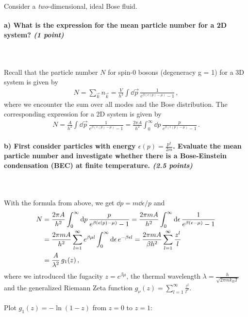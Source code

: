 Consider a \textit{two}-dimensional, ideal Bose fluid.

\paragraph{a) What is the expression for the mean particle number for a 2D system?
    \textit{(1 point)}
} \ \\
\\
Recall that the particle number $N$ for spin-0 bosons (degeneracy g = 1) 
for a 3D system is given by
\begin{align}
	N = \sum_{\vec{k}} n_{\vec{k}}
	= \frac{V}{h^3} \int \dd \vec{p} \, \frac{1}{e^{\beta (\epsilon(p) - \mu)}-1} \,,
\end{align}
where we encounter the sum over all modes and the Bose distribution. 
The corresponding expression for a 2D system is given by
\begin{align}
	N = \frac{A}{h^2} \int \dd \vec{p} \, \frac{1}{e^{\beta (\epsilon(p) - \mu)}-1}
	= \frac{2\pi A}{h^2} \int_0^{\infty} \dd p \, \frac{p}{e^{\beta (\epsilon(p) - \mu)}-1} \,.
\end{align}

\paragraph{b) First consider particles with energy $\epsilon(p)=\frac{p^2}{2m}$.
	Evaluate the mean particle number and investigate whether there is a Bose-Einstein 
	condensation (BEC) at finite temperature.
    \textit{(2.5 points)}
} \ \\
\\
With the formula from above, we get $\dd p = m \dd\epsilon / p$ and
\begin{align}
	N &= \frac{2\pi A}{h^2} \int_0^{\infty} \mathrm{d} p \, \frac{p}{e^{\beta (\epsilon(p) - \mu)}-1}
	= \frac{2\pi m A}{h^2} \int_0^{\infty} \mathrm{d}\epsilon \, \frac{1}{e^{\beta (\epsilon - \mu)}-1} \notag \\
	&= \frac{2\pi m A}{h^2} \sum_{l=1}^{\infty} e^{\beta\mu l} \int_0^{\infty} \mathrm{d}\epsilon \, e^{- \beta\epsilon l}
	= \frac{2\pi m A}{\beta h^2} \sum_{l=1}^{\infty} \frac{z^l}{l} \notag \\
	&= \frac{A}{\lambda^2} \, g_1(z) \,,
\end{align}
where we introduced the fugacity $z=e^{\beta\mu}$, the thermal wavelength $\lambda=\frac{h}{\sqrt{2\pi m k_B T}}$ 
and the generalized Riemann Zeta function $g_{\nu}(z)=\sum_{l=1}^{\infty}\frac{z^l}{l^{\nu}}$. \\
\\
Plot $g_1(z) = - \ln(1-z)$ from $z=0$ to $z=1$: \\

